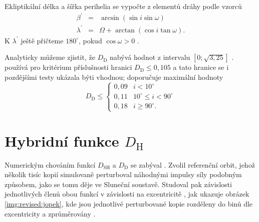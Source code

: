 Ekliptikální délka a šířka perihelia se vypočte z elementů dráhy podle vzorců \cite{cometassoc}
\begin{eqnarray}
    \beta^\prime &=& \arcsin{\left( \sin{i}\sin{\omega} \right)}\\
    \lambda^\prime &=& \Omega + \arctan{\left( \cos{i}\tan{\omega} \right)} \text{.}
\end{eqnarray}
K $\lambda^\prime$ ještě přičteme $180^\circ$, pokud $\cos{\omega}>0$ \cite{cometassoc}.

\smallskip

Analyticky můžeme zjistit, že $D_\text{D}$ nabývá hodnot z intervalu $\left[ 0;\sqrt{3{,}25} \right]$ \cite{cometassoc}. \citeauthor{cometassoc} používá pro kritérium příslušnosti hranici $D_\text{D}\le0{,}105$ \cite{cometassoc} a tato hranice se i pozdějšími testy ukázala býti vhodnou; \cite{galligan} doporučuje maximální hodnoty
$$
    D_\text{D}\le\begin{cases}
        0{,}09 & i < 10^\circ             \\
        0{,}11 & 10^\circ\le i < 90^\circ \\
        0{,}18 & i \ge 90^\circ \text{.}  %
    \end{cases}
$$

\section{Hybridní funkce $D_\text{H}$}%
Numerickým chováním funkcí $D_\text{SH}$ a $D_\text{D}$ se zabýval \citeauthor{remarks}. Zvolil referenční orbit, jehož několik tisíc kopií simulovaně perturboval náhodnými impulsy síly podobným způsobem, jako se tomu děje ve Sluneční soustavě. Studoval pak závislosti jednotlivých členů obou funkcí v závislosti na excentricitě \cite{remarks}, jak ukazuje obrázek \ref{img:revised:jopek}, kde jsou jednotlivé perturbované kopie rozděleny do binů dle excentricity a zprůměrovány \cite{remarks}.

